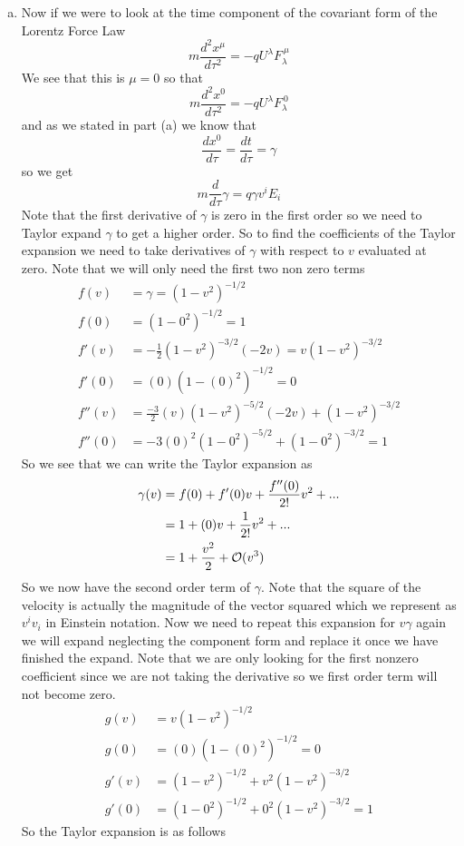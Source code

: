 \documentclass[11pt]{article}
\numberwithin{equation}{section}
\begin{document}
\begin{enumerate}[(a)]
\item
Now if we were to look at the time component of the covariant form of the Lorentz Force Law 
$$m\frac{d^2x^{\mu}}{d\tau^2} = -qU^{\lambda}F_{\lambda}^{\ \mu}$$
We see that this is $\mu=0$ so that
$$m\frac{d^2x^{0}}{d\tau^2} = -qU^{\lambda}F_{\lambda}^{\ 0}$$
and as we stated in part (a) we know that
$$\frac{dx^0}{d\tau} = \frac{dt}{d\tau} = \gamma$$
so we get
$$m\frac{d}{d\tau}\gamma = q\gamma v^iE_i$$
Note that the first derivative of $\gamma$ is zero in the first order so we need to Taylor expand $\gamma$ to get a higher order. So to find the coefficients of the Taylor expansion we need to take derivatives of $\gamma$ with respect to $v$ evaluated at zero. Note that we will only need the first two non zero terms
\begin{align*}
f(v) &= \gamma = (1-v^2)^{-1/2}\\
f(0) &= (1-0^2)^{-1/2} = 1\\
f'(v) &= -\frac{1}{2}(1-v^2)^{-3/2}(-2v) = v(1-v^2)^{-3/2}\\
f'(0) &=  (0)(1-(0)^2)^{-1/2} = 0\\
f''(v) &= \frac{-3}{2}(v)(1-v^2)^{-5/2}(-2v) + (1-v^2)^{-3/2}\\
f''(0) &= -3(0)^2(1-0^2)^{-5/2} + (1-0^2)^{-3/2} = 1
\end{align*}
So we see that we can write the Taylor expansion as
\begin{align*}
\gamma(v) &= f(0) + f'(0)v + \frac{f''(0)}{2!}v^2 + ...\\
&= 1 + (0)v + \frac{1}{2!}v^2 + ...\\
&= 1 + \frac{v^2}{2} + \mathcal{O}(v^3)
\end{align*}
So we now have the second order term of $\gamma$. Note that the square of the velocity is actually the magnitude of the vector squared which we represent as $v^iv_i$ in Einstein notation. Now we need to repeat this expansion for $v\gamma$ again we will expand neglecting the component form and replace it once we have finished the expand. Note that we are only looking for the first nonzero coefficient since we are not taking the derivative so we first order term will not become zero.
\begin{align*}
g(v) &= v(1-v^2)^{-1/2}\\
g(0) &= (0)(1-(0)^2)^{-1/2} = 0\\
g'(v) &= (1-v^2)^{-1/2} + v^2(1-v^2)^{-3/2}\\
g'(0) &= (1-0^2)^{-1/2} + 0^2(1-v^2)^{-3/2} = 1
\end{align*}
So the Taylor expansion is as follows

\end{enumerate}
\end{document}
